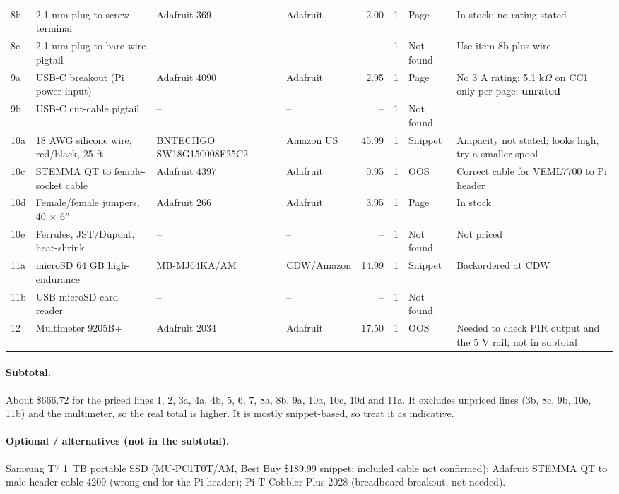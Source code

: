 \documentclass[10pt,a4paper]{article}
\begin{document}
\begin{longtable}{l p{5.4cm} p{3.6cm} p{2.6cm} r c l p{5.6cm}}
8b & 2.1 mm plug to screw terminal & Adafruit 369 & Adafruit & 2.00 & 1 & Page & In stock; no rating stated \\
8c & 2.1 mm plug to bare-wire pigtail & -- & -- & -- & 1 & Not found & Use item 8b plus wire \\
9a & USB-C breakout (Pi power input) & Adafruit 4090 & Adafruit & 2.95 & 1 & Page & No 3 A rating; 5.1 k$\Omega$ on CC1 only per page; \textbf{unrated} \\
9b & USB-C cut-cable pigtail & -- & -- & -- & 1 & Not found & \\
10a & 18 AWG silicone wire, red/black, 25 ft & BNTECHGO SW18G150008F25C2 & Amazon US & 45.99 & 1 & Snippet & Ampacity not stated; looks high, try a smaller spool \\
10c & STEMMA QT to female-socket cable & Adafruit 4397 & Adafruit & 0.95 & 1 & OOS & Correct cable for VEML7700 to Pi header \\
10d & Female/female jumpers, 40 $\times$ 6'' & Adafruit 266 & Adafruit & 3.95 & 1 & Page & In stock \\
10e & Ferrules, JST/Dupont, heat-shrink & -- & -- & -- & 1 & Not found & Not priced \\
11a & microSD 64 GB high-endurance & MB-MJ64KA/AM & CDW/Amazon & 14.99 & 1 & Snippet & Backordered at CDW \\
11b & USB microSD card reader & -- & -- & -- & 1 & Not found & \\
12 & Multimeter 9205B+ & Adafruit 2034 & Adafruit & 17.50 & 1 & OOS & Needed to check PIR output and the 5 V rail; not in subtotal \\
\bottomrule
\end{longtable}

\paragraph{Subtotal.} About \$666.72 for the priced lines 1, 2, 3a, 4a, 4b, 5, 6, 7, 8a, 8b, 9a, 10a, 10c, 10d and 11a. It excludes unpriced lines (3b, 8c, 9b, 10e, 11b) and the multimeter, so the real total is higher. It is mostly snippet-based, so treat it as indicative.

\paragraph{Optional / alternatives (not in the subtotal).} Samsung T7 1~TB portable SSD (MU-PC1T0T/AM, Best Buy \$189.99 snippet; included cable not confirmed); Adafruit STEMMA QT to male-header cable 4209 (wrong end for the Pi header); Pi T-Cobbler Plus 2028 (breadboard breakout, not needed).
\end{document}
